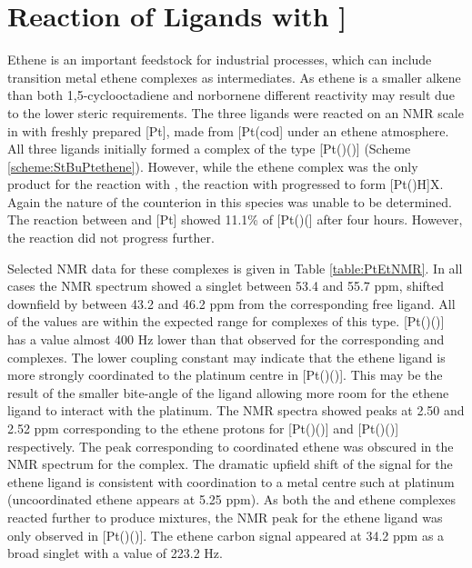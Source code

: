 \section{Reaction of \tBuxantphos{} Ligands with \texorpdfstring{\ce{[Pt(C2H4)3}]} P}

Ethene is an important feedstock for industrial processes, which can include transition metal ethene complexes as intermediates.\cite{Yoneda2001, Degnan2001}  As ethene is a smaller alkene than both 1,5-cyclooctadiene and norbornene different reactivity may result due to the lower steric requirements.  The three \tBuxantphos{} ligands were reacted on an NMR scale in  with freshly prepared [Pt], made from [Pt(cod] under an ethene atmosphere.  All three ligands initially formed a complex of the type [Pt(\tBuxantphos{})()] (Scheme \ref{scheme:StBuPtethene}).  However, while the ethene complex was the only product for the reaction with \tButhixantphos, the reaction with \tBuxantphos{} progressed to form [Pt(\tBuxantphos)H]X.  Again the nature of the counterion in this species was unable to be determined.  The reaction between \tBusixantphos and [Pt] showed 11.1\% of [Pt(\tBusixantphos)(] after four hours.  However, the reaction did not progress further.  

Selected NMR data for these complexes is given in Table \ref{table:PtEtNMR}.  In all cases the \phosphorus{} NMR spectrum showed a singlet between 53.4 and 55.7 ppm, shifted downfield by between 43.2 and 46.2 ppm from the corresponding free ligand.  All of the \JPtP{} values are within the expected range for complexes of this type.\cite{Pregosin2012}  [Pt(\tBusixantphos{})()] has a \JPtP{} value almost 400 Hz lower than that observed for the corresponding \tButhixantphos{} and \tBuxantphos{} complexes.    The lower coupling constant may indicate that the ethene ligand is more strongly coordinated to the platinum centre in [Pt(\tBusixantphos{})()].  This may be the result of the smaller bite-angle of the \tBusixantphos{} ligand allowing more room for the ethene ligand to interact with the platinum.  The \proton{} NMR spectra showed peaks at 2.50 and 2.52 ppm corresponding to the ethene protons for [Pt(\tButhixantphos{})()] and [Pt(\tBuxantphos{})()] respectively.   The peak corresponding to coordinated ethene was obscured in the \proton{} NMR spectrum for the \tBusixantphos{} complex.  The dramatic upfield shift of the \proton{} signal for the ethene ligand is consistent with coordination to a metal centre such at platinum (uncoordinated ethene appears at 5.25 ppm\cite{Fulmer2010}).  As both the \tBusixantphos{} and \tBuxantphos{} ethene complexes reacted further to produce mixtures, the \carbon{} NMR peak for the ethene ligand was only observed in [Pt(\tButhixantphos{})()].  The ethene carbon signal appeared at 34.2 ppm as a broad singlet with a \JPtC{} value of 223.2 Hz.

